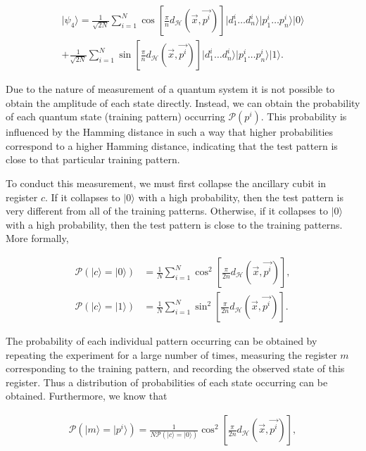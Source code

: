 \begin{align*}
    \vert \psi_4 \rangle = \frac{1}{\sqrt{2N}}\sum\limits_{i=1}^{N} \cos\left[ \frac{\pi}{n}d_\mathcal{H}\left(\Vec{x},\vec{p^i}\right) \right] \vert d_1^i\dots d_n^i\rangle\vert p_{1}^{i}\dots p_{n}^{i}\rangle \vert 0 \rangle \\ + \frac{1}{\sqrt{2N}}\sum\limits_{i=1}^{N} \sin\left[ \frac{\pi}{n}d_\mathcal{H}\left(\Vec{x},\Vec{p^i}\right)\right] \vert d_1^i\dots d_n^i\rangle\vert p_{1}^{i}\dots p_{n}^{i}\rangle \vert 1 \rangle.
\end{align*}

Due to the nature of measurement of a quantum system it is not possible to obtain the amplitude of each state directly. Instead, we can obtain the probability of each quantum state (training pattern) occurring $\mathcal{P}\left( p^i\right)$. This probability is influenced by the Hamming distance in such a way that higher probabilities correspond to a higher Hamming distance, indicating that the test pattern is close to that particular training pattern.

To conduct this measurement, we must first collapse the ancillary cubit in register $c$. If it collapses to $\vert0\rangle$ with a high probability, then the test pattern is very different from all of the training patterns. Otherwise, if it collapses to $\vert 0 \rangle$ with a high probability, then the test pattern is close to the training patterns. More formally,

\begin{align*}
    \mathcal{P}\left(\vert c \rangle = \vert 0 \rangle \right) &= \frac{1}{N} \sum\limits_{i = 1}^{N} \cos^2 \left[\frac{\pi}{2n} d_\mathcal{H}\left(\Vec{x},\vec{p^i}\right)\right], \\
    \mathcal{P}\left(\vert c \rangle = \vert 1 \rangle \right) &= \frac{1}{N} \sum\limits_{i = 1}^{N} \sin^2 \left[\frac{\pi}{2n} d_\mathcal{H}\left(\Vec{x},\vec{p^i}\right)\right].
\end{align*}

The probability of each individual pattern occurring can be obtained by repeating the experiment for a large number of times, measuring the register $m$ corresponding to the training pattern, and recording the observed state of this register. Thus a distribution of probabilities of each state occurring can be obtained. Furthermore, we know that 

\begin{align*}
    \mathcal{P}\left(\vert m \rangle = \vert p^i \rangle \right) = \frac{1}{N\mathcal{P}\left(\vert c \rangle = \vert 0 \rangle \right)} \cos^2 \left[\frac{\pi}{2n} d_\mathcal{H}\left(\Vec{x},\vec{p^i}\right)\right],    
\end{align*}

